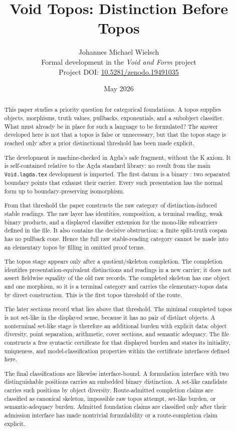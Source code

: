 \documentclass[11pt]{article}
\title{Void Topos: Distinction Before Topos}
\author{Johannes Michael Wielsch\\
\small Formal development in the \emph{Void and Form} project\\
\small Project DOI: \href{https://doi.org/10.5281/zenodo.19491035}{10.5281/zenodo.19491035}}
\date{May 2026}
\begin{document}
\maketitle

\begin{abstract}
This paper studies a priority question for categorical foundations.  A
topos supplies objects, morphisms, truth values, pullbacks,
exponentials, and a subobject classifier.  What must already be in place
for such a language to be formulated?  The answer developed here is not
that a topos is false or unnecessary, but that the topos stage is reached
only after a prior distinctional threshold has been made explicit.

The development is machine-checked in Agda's safe fragment, without the
K axiom.  It is self-contained relative to the Agda standard library: no
result from the main \texttt{Void.lagda.tex} development is imported.
The first datum is a binary
: two separated boundary points that exhaust
their carrier.  Every such presentation has the normal form
 up to boundary-preserving isomorphism.

From that threshold the paper constructs the raw category of
distinction-induced stable readings.  The raw layer has identities,
composition, a terminal reading, weak binary products, and a displayed
classifier extension for the mono-like subcarriers defined in the file.
It also contains the decisive obstruction: a finite split-truth cospan
has no pullback cone.  Hence the full raw stable-reading category cannot
be made into an elementary topos by filling in omitted proof terms.

The topos stage appears only after a quotient/skeleton completion.  The
completion identifies presentation-equivalent distinctions and readings
in a new carrier; it does not assert fieldwise equality of the old raw
records.  The completed skeleton has one object and one morphism, so it
is a terminal category and carries the elementary-topos data by direct
construction.  This is the first topos threshold of the route.

The later sections record what lies above that threshold.  The minimal
completed topos is not set-like in the displayed sense, because it has no
pair of distinct objects.  A nonterminal set-like stage is therefore an
additional burden with explicit data: object diversity, point separation,
arithmetic, cover sections, and semantic adequacy.  The file constructs
a free syntactic certificate for that displayed burden and states its
initiality, uniqueness, and model-classification properties within the
certificate interfaces defined here.

The final classifications are likewise interface-bound.  A formulation
interface with two distinguishable positions carries an embedded binary
distinction.  A set-like candidate carries such positions by object
diversity.  Route-admitted completion claims are classified as canonical
skeleton, impossible raw topos attempt, set-like burden, or
semantic-adequacy burden.  Admitted foundation claims are classified only
after their admission interface has made nontrivial formulability or a
route-completion claim explicit.
\end{abstract}
\end{document}
